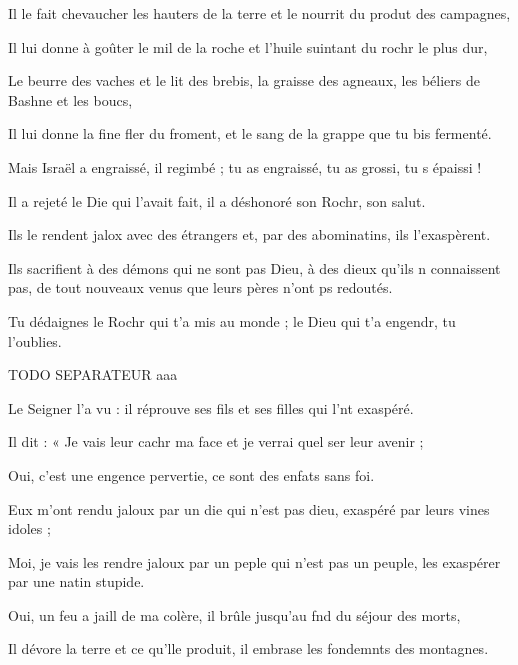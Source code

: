 \item Il le fait chevaucher les hauters de la terre\psstar{} et le nourrit du produt des campagnes,
\item Il lui donne à goûter le mil de la roche\psstar{} et l’huile suintant du rochr le plus dur,
\item Le beurre des vaches et le lit des brebis,\psstar{} la graisse des agneaux, les béliers de Bashne et les boucs,
\item Il lui donne la fine fler du froment,\psstar{} et le sang de la grappe que tu bis fermenté.
\item Mais Israël a engraissé, il  regimbé ;\psstar{} tu as engraissé, tu as grossi, tu s épaissi ! 
\item Il a rejeté le Die qui l’avait fait,\psstar{} il a déshonoré son Rochr, son salut.
\item Ils le rendent jalox avec des étrangers\psstar{} et, par des abominatins, ils l’exaspèrent.
\item Ils sacrifient à des démons qui ne sont pas Dieu,\pscross{} à des dieux qu’ils n connaissent pas,\psstar{} de tout nouveaux venus que leurs pères n’ont ps redoutés.
\item Tu dédaignes le Rochr qui t’a mis au monde ;\psstar{} le Dieu qui t’a engendr, tu l’oublies.
\item TODO SEPARATEUR aaa
\item Le Seigner l’a vu :\psstar{} il réprouve ses fils et ses filles qui l’nt exaspéré.
\item Il dit : « Je vais leur cachr ma face\psstar{} et je verrai quel ser leur avenir ;
\item Oui, c’est une engence pervertie,\psstar{} ce sont des enfats sans foi.
\item Eux m’ont rendu jaloux par un die qui n’est pas dieu,\psstar{} exaspéré par leurs vines idoles ;
\item Moi, je vais les rendre jaloux par un peple qui n’est pas un peuple,\psstar{} les exaspérer par une natin stupide.
\item Oui, un feu a jaill de ma colère,\psstar{} il brûle jusqu’au fnd du séjour des morts,
\item Il dévore la terre et ce qu’lle produit,\psstar{} il embrase les fondemnts des montagnes.
